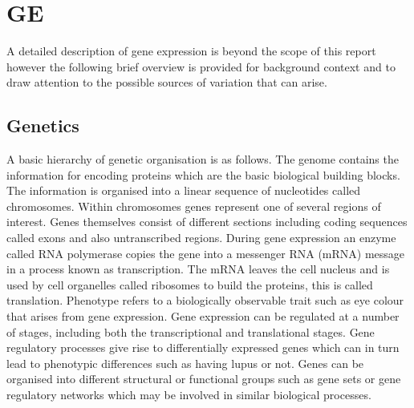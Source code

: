 \documentclass[a4paper, 12pt]{report}
\begin{document}



\section{\gls{GE}}
A detailed description of gene expression is beyond the scope of this report however the following brief overview is provided for background context and to draw attention to the possible sources of variation that can arise.

\subsection*{Genetics}
A basic hierarchy of genetic organisation is as follows. The genome contains the information for encoding proteins which are the basic biological building blocks. The information is organised into a linear sequence of nucleotides called chromosomes. Within chromosomes genes represent one of several regions of interest. Genes themselves consist of different sections including coding sequences called exons and also untranscribed regions. During gene expression an enzyme called RNA polymerase copies the gene into a messenger RNA (mRNA) message in a process known as transcription. The mRNA  leaves the cell nucleus and is used by cell organelles called ribosomes to build the proteins, this is called translation.  Phenotype refers to a biologically observable trait such as eye colour that arises from gene expression.  Gene expression can be regulated at a number of stages, including both the transcriptional and translational stages. Gene regulatory processes give rise to differentially expressed genes which can in turn lead to phenotypic differences such as having lupus or not. Genes can be organised into different structural or functional groups such as gene sets or gene regulatory networks which may be involved in similar biological processes.
\end{document}
